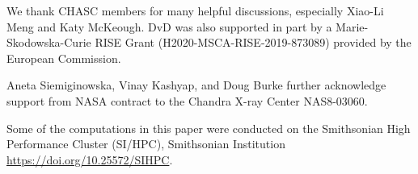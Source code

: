 \documentclass[twocolumn]{aastex631}
\begin{document}
    We thank CHASC members for many helpful discussions, especially Xiao-Li Meng and Katy McKeough.
    DvD was also supported in part by a Marie-Skodowska-Curie RISE Grant (H2020-MSCA-RISE-2019-873089)
    provided by the European Commission.
    
    Aneta Siemiginowska, Vinay Kashyap, and Doug Burke further acknowledge support from NASA
    contract to the Chandra X-ray Center NAS8-03060.

    Some of the computations in this paper were conducted on the Smithsonian High Performance
    Cluster (SI/HPC), Smithsonian Institution \url{https://doi.org/10.25572/SIHPC}.

    \newpage
    
\end{document}

